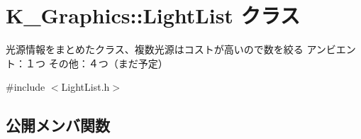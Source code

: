 \hypertarget{class_k___graphics_1_1_light_list}{}\section{K\+\_\+\+Graphics\+:\+:Light\+List クラス}
\label{class_k___graphics_1_1_light_list}


光源情報をまとめたクラス、複数光源はコストが高いので数を絞る アンビエント：１つ その他：４つ（まだ予定）  




{\ttfamily \#include $<$Light\+List.\+h$>$}

\subsection*{公開メンバ関数}
